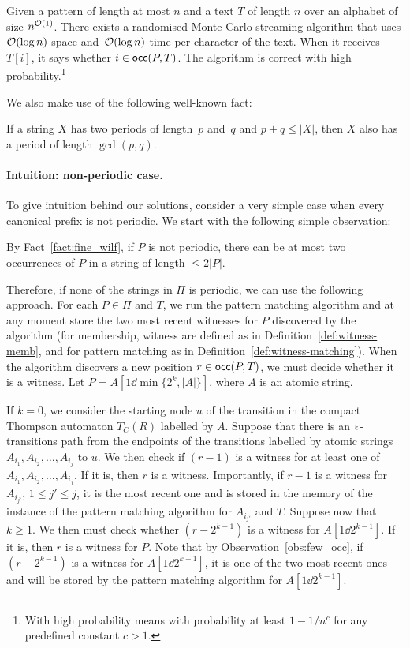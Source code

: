 \begin{thm}\label{th:pattern_matching}
Given a pattern of length at most $n$ and a text $T$ of length $n$ over an alphabet of size $n^{\mathcal{O}(1)}$. There exists a randomised Monte Carlo streaming algorithm that uses $\mathcal{O}(\log n)$ space and~$\mathcal{O}(\log n)$ time per character of the text. When it receives $T[i]$, it says whether $i \in \mathsf{occ}(P,T)$. The algorithm is correct with high probability.\footnote{With high probability means with probability at least $1-1/n^c$ for any predefined constant $c>1$.}
\end{thm}
\noindent
We also make use of the following well-known fact:
\begin{fact}\label{fact:fine_wilf}
If a string $X$ has two periods of length~$p$ and~$q$ and $p+q \le |X|$, then $X$ also has a period of length $\gcd(p,q)$.
\end{fact}

\paragraph{Intuition: non-periodic case.} 
To give intuition behind our solutions, consider a very simple case when every canonical prefix is not periodic. We start with the following simple observation:

\begin{observation}\label{obs:few_occ}
By Fact~\ref{fact:fine_wilf}, if $P$ is not periodic, there can be at most two occurrences of $P$ in a string of length $\le 2|P|$.
\end{observation}

Therefore, if none of the strings in $\Pi$ is periodic, we can use the following approach. For each $P \in \Pi$ and $T$, we run the pattern matching algorithm and at any moment store the two most recent witnesses for $P$ discovered by the algorithm (for membership, witness are defined as in Definition~\ref{def:witness-memb}, and for pattern matching as in Definition~\ref{def:witness-matching}). When the algorithm discovers a new position $r \in \mathsf{occ}(P,T)$, we must decide whether it is a witness. Let $P = A[1 \dd \min\{2^k, |A|\}]$, where $A$ is an atomic string. 

If $k = 0$, we consider the starting node $u$ of the transition in the compact Thompson automaton $T_C(R)$ labelled by $A$. Suppose that there is an $\varepsilon$-transitions path from the endpoints of the transitions labelled by atomic strings $A_{i_1}, A_{i_2}, \ldots, A_{i_j}$ to $u$. We then check if $(r-1)$ is a witness for at least one of $A_{i_1}, A_{i_2}, \ldots, A_{i_j}$. If it is, then $r$ is a witness. Importantly, if $r-1$ is a witness for $A_{i_{j'}}$, $1 \le j' \le j$, it is the most recent one and is stored in the memory of the instance of the pattern matching algorithm for $A_{i_{j'}}$ and $T$. Suppose now that $k \ge 1$. We then must check whether $(r-2^{k-1})$ is a witness for $A[1\dd 2^{k-1}]$. If it is, then $r$ is a witness for $P$. Note that by Observation~\ref{obs:few_occ}, if $(r-2^{k-1})$ is a witness for $A[1\dd 2^{k-1}]$, it is one of the two most recent ones and will be stored by the pattern matching algorithm for $A[1\dd 2^{k-1}]$.

